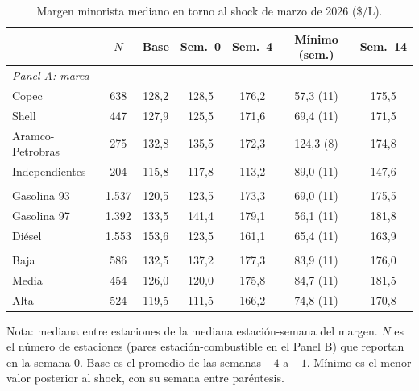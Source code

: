 \documentclass[11pt]{article}
\begin{document}
\begin{table}[htbp]
\centering
\caption{Margen minorista mediano en torno al shock de marzo de 2026
(\$/L).}
\label{tab:margenes}
\begin{tabular}{lcccccc}
\toprule
 & $N$ & Base & Sem.\ 0 & Sem.\ 4 & Mínimo (sem.) & Sem.\ 14 \\
\midrule
\multicolumn{7}{l}{\emph{Panel A: marca}} \\
Copec             & 638   & 128,2 & 128,5 & 176,2 & 57,3 (11)  & 175,5 \\
Shell             & 447   & 127,9 & 125,5 & 171,6 & 69,4 (11)  & 171,5 \\
Aramco-Petrobras  & 275   & 132,8 & 135,5 & 172,3 & 124,3 (8)  & 174,8 \\
Independientes    & 204   & 115,8 & 117,8 & 113,2 & 89,0 (11)  & 147,6 \\
\addlinespace
\multicolumn{7}{l}{\emph{Panel B: combustible}} \\
Gasolina 93       & 1.537 & 120,5 & 123,5 & 173,3 & 69,0 (11)  & 175,5 \\
Gasolina 97       & 1.392 & 133,5 & 141,4 & 179,1 & 56,1 (11)  & 181,8 \\
Diésel            & 1.553 & 153,6 & 123,5 & 161,1 & 65,4 (11)  & 163,9 \\
\addlinespace
\multicolumn{7}{l}{\emph{Panel C: competidores a 2 km (terciles)}} \\
Baja              & 586   & 132,5 & 137,2 & 177,3 & 83,9 (11)  & 176,0 \\
Media             & 454   & 126,0 & 120,0 & 175,8 & 84,7 (11)  & 181,5 \\
Alta              & 524   & 119,5 & 111,5 & 166,2 & 74,8 (11)  & 170,8 \\
\bottomrule
\end{tabular}

\medskip
\begin{minipage}{0.95\textwidth}
\footnotesize
Nota: mediana entre estaciones de la mediana estación-semana del margen. $N$
es el número de estaciones (pares estación-combustible en el Panel B) que
reportan en la semana 0. Base es el promedio de las semanas $-4$ a $-1$.
Mínimo es el menor valor posterior al shock, con su semana entre paréntesis.
\end{minipage}
\end{table}
\end{document}
